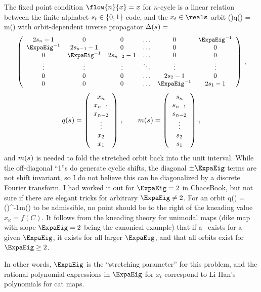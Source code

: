 {The fixed point condition $\flow{n}{x}=x$ for $n$-cycle
is a linear relation between the finite alphabet ${s_{t}}\in\{0,1\}$ code, and
the $x_{t}\in\reals$ orbit
\beq
  \Delta(\Ssym{})q(\Ssym{}) = m(\Ssym{})
with orbit-dependent inverse propagator $\Delta({s_{}})= $
\[
{\small
\left(\begin{array}{cccccc}
      {2\Ssym{n}-1}     & 0     &     0  & \dots  & 0 & \ExpaEig^{-1}\\
      \ExpaEig^{-1}     & {2\Ssym{n-1}-1} &     0     &\dots  &  0 & 0\\
       0 & \ExpaEig^{-1} &    {2\Ssym{n-2}-1} &\dots  &  0 & 0\\
      \vdots&\vdots &   \vdots & \ddots &\vdots  &\vdots \\
       0 &  0 &    0  & \dots  & {2\Ssym{2}-1}& 0\\
      0     &  0 &    0  & \dots  &\ExpaEig^{-1}  & {2\Ssym{1}-1}\\
     \end{array} \right)
\,,
} %
\]
\[
q({s_{}})= \left(\begin{array}{c}
      x_{{n}}\\
      x_{{n-1}}\\
      x_{{n-2}}\\
      \vdots\\
      x_{{2}}\\
      x_{{1}}\\
     \end{array} \right)
\,,\qquad
m({s_{}})= \left(\begin{array}{c}
      {{\ensuremath{s_{n}}}}\\
      {{s_{n-1}}}\\
      {{s_{n-2}}}\\
      \vdots\\
      {{s_{2}}}\\
      {{s_{1}}}\\
     \end{array} \right)
\,,
\]
and $m({s_{}})$ is needed to fold the stretched orbit back into the unit
interval.
While the off-diagonal ``1''s do generate cyclic shifts, the diagonal $\pm
\ExpaEig$ terms are not shift invariant, so I do not believe this can be
diagonalized by a discrete Fourier transform. I had worked it out for
$\ExpaEig=2$ in Chaos\-Book, but not sure if there are elegant tricks for
arbitrary $\ExpaEig\neq2$. For an orbit
\beq
  q(\Ssym{}) = \Delta(\Ssym{})^{-1}m(\Ssym{})
to be admissible, no point should be to the right of
the kneading value $x_\kappa = f(C)$. It follows from
the kneading theory for unimodal maps (dike map with slope
$\ExpaEig=2$ being the canonical example) that if a \po \ exists for
a given $\ExpaEig$, it exists for all larger $\ExpaEig$,
and that all orbits exist for $\ExpaEig \geq 2$.

In other words, $\ExpaEig$ is the ``stretching parameter'' for this
problem, and the rational polynomial expressions in $\ExpaEig$
for $x_{t}$ correspond to Li Han's polynomials for cat maps.
    } %

